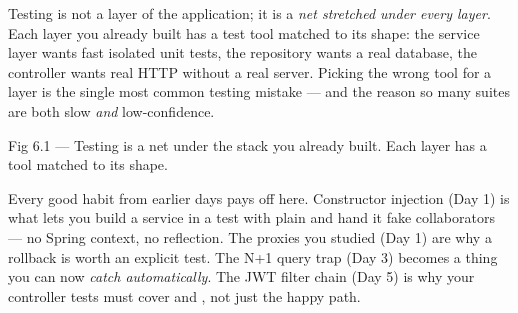  Testing is not a layer of the application; it is a \emph{net stretched under every layer}. Each layer you already built has a test tool matched to its shape: the service layer wants fast isolated unit tests, the repository wants a real database, the controller wants real HTTP without a real server. Picking the wrong tool for a layer is the single most common testing mistake --- and the reason so many suites are both slow \emph{and} low-confidence.

\begin{wbfigure}{Fig 6.1 --- Testing is a net under the stack you already built. Each layer has a tool matched to its shape.}
\end{wbfigure}

 Every good habit from earlier days pays off here. Constructor injection (Day 1) is what lets you build a service in a test with plain  and hand it fake collaborators --- no Spring context, no reflection. The proxies you studied (Day 1) are why a  rollback is worth an explicit test. The N+1 query trap (Day 3) becomes a thing you can now \emph{catch automatically}. The JWT filter chain (Day 5) is why your controller tests must cover  and , not just the happy path.

